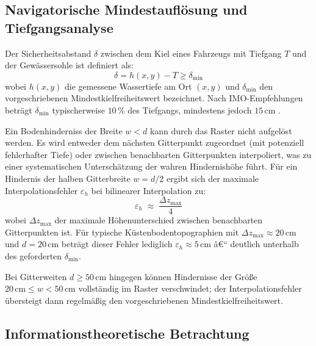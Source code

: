 ﻿\documentclass[a4paper,12pt]{article}
\theoremstyle{definition}
\begin{document}
\subsection{Navigatorische Mindestauflösung und Tiefgangsanalyse}

Der Sicherheitsabstand $\delta$ zwischen dem Kiel eines Fahrzeugs mit
Tiefgang $T$ und der Gewässersohle ist definiert als:
\begin{equation}
  \delta = h(x,y) - T \geq \delta_{\min}
  \label{eq:kielfreiheit}
\end{equation}
wobei $h(x,y)$ die gemessene Wassertiefe am Ort $(x,y)$ und $\delta_{\min}$
den vorgeschriebenen Mindestkielfreiheitswert bezeichnet. Nach IMO-Empfehlungen
beträgt $\delta_{\min}$ typischerweise $10\,\%$ des Tiefgangs, mindestens
jedoch $15\,\text{cm}$ \cite{imomsccircularnav}.

\medskip\noindent
Ein Bodenhinderniss der Breite $w < d$ kann durch das Raster nicht
aufgelöst werden. Es wird entweder dem nächsten Gitterpunkt zugeordnet
(mit potenziell fehlerhafter Tiefe) oder zwischen benachbarten
Gitterpunkten interpoliert, was zu einer systematischen
Unterschätzung der wahren Hindernishöhe führt. Für ein Hindernis
der halben Gitterbreite $w = d/2$ ergibt sich der maximale
Interpolationsfehler $\varepsilon_h$ bei bilinearer Interpolation zu:
\begin{equation}
  \varepsilon_h \;\approx\; \frac{\Delta z_{\max}}{4}
  \label{eq:interpfehler}
\end{equation}
wobei $\Delta z_{\max}$ der maximale Höhenunterschied zwischen
benachbarten Gitterpunkten ist. Für typische Küstenbodentopographien
mit $\Delta z_{\max} \approx 20\,\text{cm}$ und $d = 20\,\text{cm}$
beträgt dieser Fehler lediglich $\varepsilon_h \approx 5\,\text{cm}$
â€“ deutlich unterhalb des geforderten $\delta_{\min}$.

\medskip\noindent
Bei Gitterweiten $d \geq 50\,\text{cm}$ hingegen können Hindernisse der
Größe $20\,\text{cm} \leq w < 50\,\text{cm}$ vollständig im Raster
verschwindet; der Interpolationsfehler übersteigt dann regelmäßig den
vorgeschriebenen Mindestkielfreiheitswert.

\subsection{Informationstheoretische Betrachtung}
\end{document}
